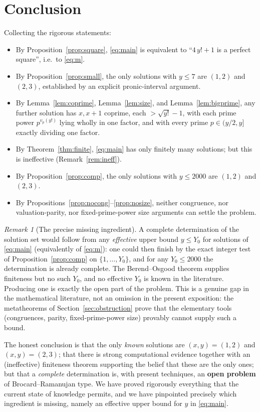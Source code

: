 \documentclass{amsart}
\theoremstyle{plain}
\theoremstyle{remark}
\newtheorem{remark}{Remark}
\begin{document}
\section{Conclusion}

Collecting the rigorous statements:
\begin{itemize}
\item By Proposition~\ref{prop:square}, \eqref{eq:main} is equivalent to
``$4\,y!+1$ is a perfect square'', i.e.\ to \eqref{eq:m}.
\item By Proposition~\ref{prop:small}, the only solutions with $y\le 7$ are
$(1,2)$ and $(2,3)$, established by an explicit pronic-interval argument.
\item By Lemma~\ref{lem:coprime}, Lemma~\ref{lem:size}, and
Lemma~\ref{lem:bigprime}, any further solution has $x,x+1$ coprime, each
$>\sqrt{y!}-1$, with each prime power $p^{v_p(y!)}$ lying wholly in one
factor, and with every prime $p\in(y/2,y]$ exactly dividing one factor.
\item By Theorem~\ref{thm:finite}, \eqref{eq:main} has only finitely many
solutions; but this is ineffective (Remark~\ref{rem:ineff}).
\item By Proposition~\ref{prop:comp}, the only solutions with $y\le 2000$
are $(1,2)$ and $(2,3)$.
\item By Propositions~\ref{prop:nocong}--\ref{prop:nosize}, neither
congruence, nor valuation-parity, nor fixed-prime-power size arguments can
settle the problem.
\end{itemize}

\begin{remark}[The precise missing ingredient]\label{rem:missing}
A complete determination of the solution set would follow from any
\emph{effective} upper bound $y\le Y_0$ for solutions of \eqref{eq:main}
(equivalently of \eqref{eq:m}): one could then finish by the exact integer
test of Proposition~\ref{prop:comp} on $\{1,\dots,Y_0\}$, and for any
$Y_0\le 2000$ the determination is already complete. The Berend--Osgood
theorem supplies finiteness but no such $Y_0$, and no effective $Y_0$ is
known in the literature. Producing one is exactly the open part of the
problem. This is a genuine gap in the mathematical literature, not an
omission in the present exposition: the metatheorems of
Section~\ref{sec:obstruction} prove that the elementary tools (congruences,
parity, fixed-prime-power size) provably cannot supply such a bound.
\end{remark}

The honest conclusion is that the only \emph{known} solutions are
$(x,y)=(1,2)$ and $(x,y)=(2,3)$; that there is strong computational evidence
together with an (ineffective) finiteness theorem supporting the belief that
these are the only ones; but that a \emph{complete} determination is, with
present techniques, an \textbf{open problem} of Brocard--Ramanujan type. We
have proved rigorously everything that the current state of knowledge
permits, and we have pinpointed precisely which ingredient is missing,
namely an effective upper bound for $y$ in \eqref{eq:main}.
\end{document}
